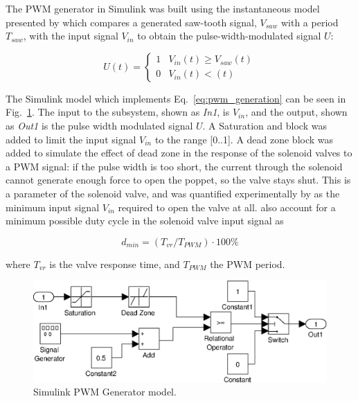 The PWM generator in Simulink was built using the instantaneous model presented by \citet{valve_models} which compares a generated saw-tooth signal, $V_{saw}$ with a period $T_{saw}$, with the input signal $V_{in}$ to obtain the pulse-width-modulated signal $U$:

\begin{equation}
\label{eq:pwm_generation}
U\left(t\right) = 
\begin{cases}
1 & V_{in}\left(t\right) \geq V_{saw}\left(t\right) \\
0 & V_{in}\left(t\right) < \left(t\right)
\end{cases}
\end{equation}

The Simulink model which implements Eq.\ \ref{eq:pwm_generation} can be seen in Fig.\ \ref{fig:pneumatics_pwm}. The input to the subsystem, shown as \emph{In1}, is $V_{in}$, and the output, shown as \emph{Out1} is the pulse width modulated signal $U$. A Saturation and block was added to limit the input signal $V_{in}$ to the range [0..1]. A dead zone block was added to simulate the effect of dead zone in the response of the solenoid valves to a PWM signal: if the pulse width is too short, the current through the solenoid cannot generate enough force to open the poppet, so the valve stays shut. This is a parameter of the solenoid valve, and was quantified experimentally by \cite{valve_models} as the minimum input signal $V_{in}$ required to open the valve at all.  also account for a minimum possible duty cycle in the solenoid valve input signal as

\begin{equation}
  \label{eq:pwm_duty_min}
  d_{min}=\left(T_{vr}/T_{PWM}\right)\cdot100\%
\end{equation}

where $T_{vr}$ is the valve response time, and $T_{PWM}$ the PWM period.


\begin{figure}[h]
\centering
\includegraphics[scale=0.65]{implementation/figures/pneumatic_modelling2.eps}
\caption{Simulink PWM Generator model.}
\label{fig:pneumatics_pwm}
\end{figure}

